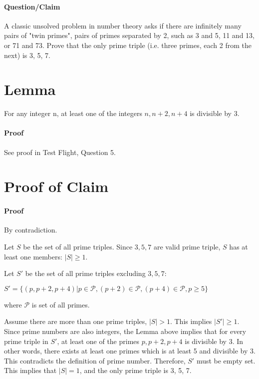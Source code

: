 \documentclass[14pt]{extarticle}
\begin{document}
	\paragraph{Question/Claim} A classic unsolved problem in number theory asks if there are infinitely many pairs of "twin primes", pairs of primes separated by 2, such as 3 and 5, 11 and 13, or 71 and 73. Prove that the only prime triple (i.e. three primes, each 2 from the next) is 3, 5, 7.
	\section{Lemma}
	For any integer n, at least one of the integers $n, n+2, n+4$ is divisible by 3.
	\paragraph{Proof} See proof in Test Flight, Question 5.
	\section{Proof of Claim}
	\paragraph{Proof} By contradiction.
	\par\bigskip
	Let $S$ be the set of all prime triples.  Since $3, 5, 7$ are valid prime triple, $S$ has at least one members: $|S| \ge 1$.
	\par\bigskip
	Let $S'$ be the set of all prime triples excluding $3, 5, 7$:
	\begin{center}
	$S' = \{(p, p+2, p+4)|p \in \mathcal{P}, (p+2) \in \mathcal{P}, (p+4) \in \mathcal{P}, p \ge 5\}$
	\end{center}
	where $\mathcal{P}$ is set of all primes.
	\par\bigskip
	Assume there are more than one prime triples, $|S| > 1$.  This implies $|S'| \ge 1$.
	Since prime numbers are also integers, the Lemma above implies that for every prime triple in $S'$, at least one of the primes $p, p+2, p+4$ is divisible by 3.  In other words, there exists at least one primes which is at least 5 and divisible by 3.  This contradicts the definition of prime number.  Therefore, $S'$ must be empty set.  This implies that $|S| = 1$, and the only prime triple is 3, 5, 7.
\end{document}
